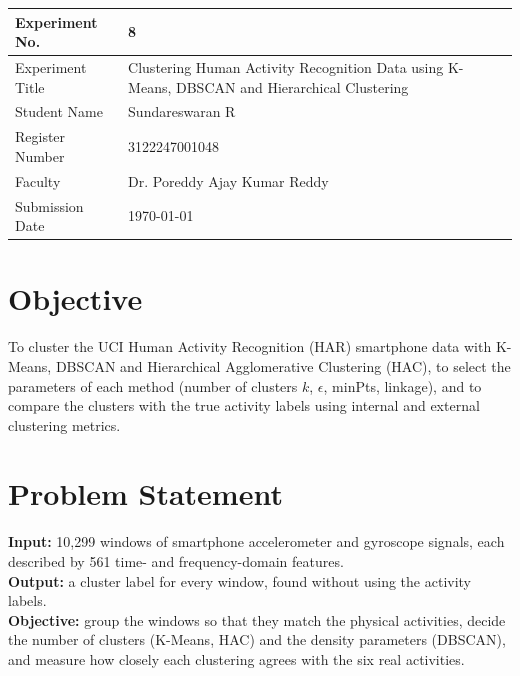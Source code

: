 \documentclass[12pt,a4paper]{article}
\begin{document}
\begin{tabular}{|p{4cm}|p{10.5cm}|}
\hline
Experiment No. & 8 \\ \hline
Experiment Title &
Clustering Human Activity Recognition Data using K-Means, DBSCAN and Hierarchical Clustering\footnotemark \\ \hline
Student Name & Sundareswaran R \\ \hline
Register Number & 3122247001048 \\ \hline
Faculty & Dr. Poreddy Ajay Kumar Reddy \\ \hline
Submission Date & \today \\ \hline
\end{tabular}

\section{Objective}
To cluster the UCI Human Activity Recognition (HAR) smartphone data with K-Means, DBSCAN and Hierarchical Agglomerative Clustering (HAC), to select the parameters of each method (number of clusters $k$, $\epsilon$, minPts, linkage), and to compare the clusters with the true activity labels using internal and external clustering metrics.

\section{Problem Statement}
\textbf{Input:} 10,299 windows of smartphone accelerometer and gyroscope signals, each described by 561 time- and frequency-domain features.\\
\textbf{Output:} a cluster label for every window, found without using the activity labels.\\
\textbf{Objective:} group the windows so that they match the physical activities, decide the number of clusters (K-Means, HAC) and the density parameters (DBSCAN), and measure how closely each clustering agrees with the six real activities.

\end{document}

